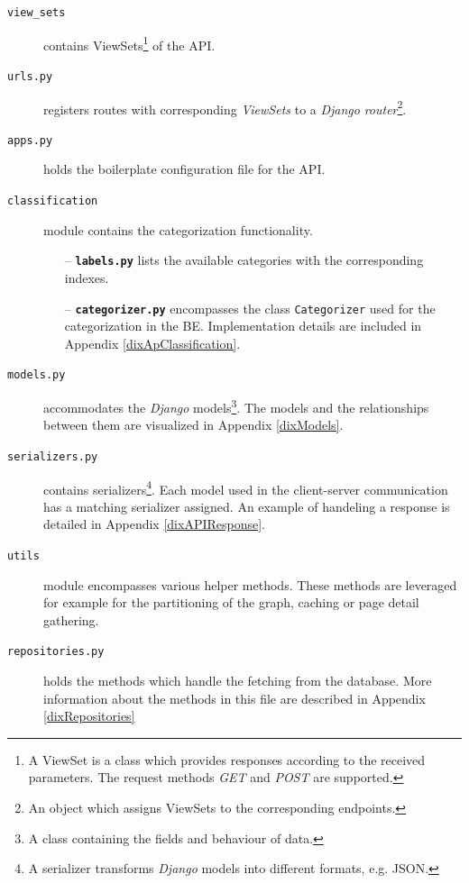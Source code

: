 \begin{description}
    \item[\texttt{view\_sets}] contains ViewSets\footnote{A ViewSet is a class which provides responses according to the received parameters. The request methods \textit{GET} and \textit{POST} are supported.} of the API.
    \item [\texttt{urls.py}] registers routes with corresponding \textit{ViewSets} to a \textit{Django} \textit{router}\footnote{An object which assigns ViewSets to the corresponding endpoints.}.
    \item[\texttt{apps.py}] holds the boilerplate configuration file for the API.
    \item[\texttt{classification}] module contains the categorization functionality.
        \begin{itemize}            
            \item[--] \textbf{\texttt{labels.py}} lists the available categories with the corresponding indexes. 
            \item[--] \textbf{\texttt{categorizer.py}} encompasses the class \texttt{Categorizer} used for the categorization in the BE. Implementation details are included in Appendix \ref{dixApClassification}.
        \end{itemize} 
    \item[\texttt{models.py}] accommodates the \textit{Django} models\footnote{A class containing the fields and behaviour of data.}. The models and the relationships between them are visualized in Appendix \ref{dixModels}. 
    \item[\texttt{serializers.py}] contains serializers\footnote{A serializer transforms \textit{Django} models into different formats, e.g. JSON.}. Each model used in the client-server communication has a matching serializer assigned. An example of handeling a response is detailed in Appendix \ref{dixAPIResponse}.
    \item[\texttt{utils}] module encompasses various helper methods. These methods are leveraged for example for the partitioning of the graph, caching or page detail gathering.
    \item[\texttt{repositories.py}] holds the methods which handle the fetching from the database. More information about the methods in this file are described in Appendix \ref{dixRepositories}
\end{description} 





